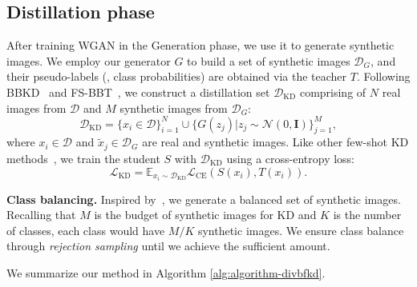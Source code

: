 \subsection{Distillation phase}
\begin{foldable}
  After training WGAN in the Generation phase, we use it to generate synthetic images.
  We employ our generator $G$ to build a set of synthetic images $\mathcal{D}_G$, and their pseudo-labels (\ie, class probabilities) are obtained via the teacher $T$.
  Following BBKD~\cite{wang2020neural} and FS-BBT~\cite{nguyen2022black}, we construct a distillation set $\mathcal{D}_\text{KD}$ comprising of $N$ real images from $\mathcal{D}$ and $M$ synthetic images from $\mathcal{D}_G$:
  \begin{equation}
    \mathcal{D}_\text{KD} = {
      \{x_{i} \in \mathcal{D}\}_{i=1}^{N} \cup
      \{G(z_{j}) | z_{j} \sim \mathcal{N}(0, \mathbf{I})\}_{j=1}^{M}
    },
    \label{eq:distill-set}
  \end{equation}
  where $x_{i} \in \mathcal{D}$ and $\tilde{x}_{j} \in \mathcal{D}_G$ are real and synthetic images.
  Like other few-shot \ac{KD} methods~\cite{wang2020neural,nguyen2022black}, we train the student $S$ with $\mathcal{D}_\text{KD}$ using a cross-entropy loss:
  \begin{equation}
    \mathcal{L}_\text{KD} = \mathbb{E}_{x_{i} \sim \mathcal{D}_\text{KD}} \mathcal{L}_\text{CE}(S(x_{i}), T(x_{i})).
    \label{eq:loss-S}
  \end{equation}
\end{foldable}

\begin{foldable}
  \textbf{Class balancing.} Inspired by~\cite{chen2019data,zhang2022ideal}, we generate a balanced set of synthetic images.
  Recalling that $M$ is the budget of synthetic images for \ac{KD} and $K$ is the number of classes, each class would have $M / K$ synthetic images.
  We ensure class balance through \textit{rejection sampling} until we achieve the sufficient amount.
\end{foldable}

We summarize our method in Algorithm \ref{alg:algorithm-divbfkd}.
